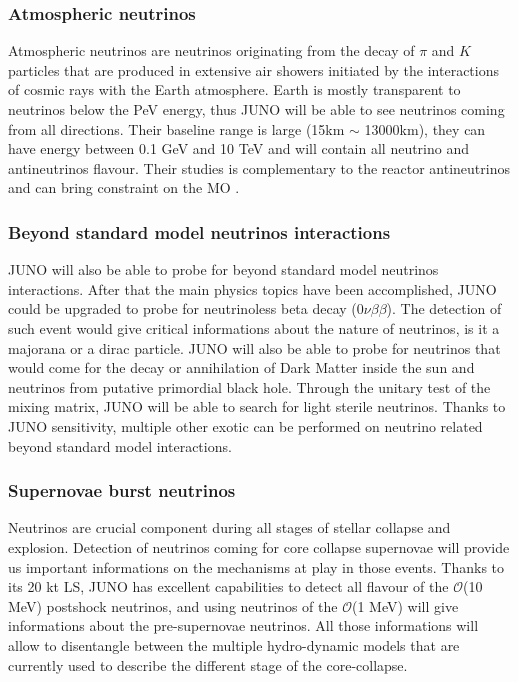 \subsubsection{Atmospheric neutrinos}

Atmospheric neutrinos are neutrinos originating from the decay of $\pi$ and $K$ particles that are produced in extensive air showers initiated by the interactions of cosmic rays with the Earth atmosphere. Earth is mostly transparent to neutrinos below the PeV energy, thus JUNO will be able to see neutrinos coming from all directions. Their baseline range is large (15km $\sim$ 13000km), they can have energy between 0.1 GeV and 10 TeV and will contain all neutrino and antineutrinos flavour. Their studies is complementary to the reactor antineutrinos and can bring constraint on the MO \cite{an_neutrino_2016}.

\subsubsection{Beyond standard model neutrinos interactions}

JUNO will also be able to probe for beyond standard model neutrinos interactions. After that the main physics topics have been accomplished, JUNO could be upgraded to probe for neutrinoless beta decay ($0\nu\beta\beta$). The detection of such event would give critical informations about the nature of neutrinos, is it a majorana or a dirac particle. JUNO will also be able to probe for neutrinos that would come for the decay or annihilation of Dark Matter inside the sun and neutrinos from putative primordial black hole.
Through the unitary test of the mixing matrix, JUNO will be able to search for light sterile neutrinos.
Thanks to JUNO sensitivity, multiple other exotic can be performed on neutrino related beyond standard model interactions.

\subsubsection{Supernovae burst neutrinos}

Neutrinos are crucial component during all stages of stellar collapse and explosion. Detection of neutrinos coming for core collapse supernovae will provide us important informations on the mechanisms at play in those events.
Thanks to its 20 kt LS, JUNO has excellent capabilities to detect all flavour of the $\mathcal{O}$(10 MeV) postshock neutrinos, and using neutrinos of the $\mathcal{O}$(1 MeV) will give informations about the pre-supernovae neutrinos. All those informations will allow to disentangle between the multiple hydro-dynamic models that are currently used to describe the different stage of the core-collapse.


